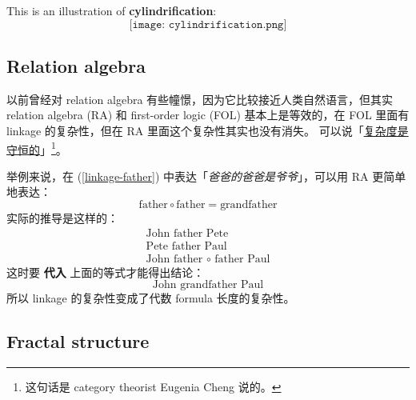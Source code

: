 \documentclass[orivec]{llncs}
\newcommand{\emp}[1]{\textbf{\textcolor{Cerulean}{#1}}}
\begin{document}
\begin{tcolorbox}
This is an illustration of \textbf{cylindrification}:
\begin{equation}
\texttt{[image: cylindrification.png]}
\end{equation}

\subsection{Relation algebra}


以前曾经对 relation algebra \cite{Schmidt2010} \cite{Maddux2006} 有些幢憬，因为它比较接近人类自然语言，但其实 relation algebra (RA) 和 first-order logic (FOL) 基本上是等效的，在 FOL 里面有 linkage 的复杂性，但在 RA 里面这个复杂性其实也没有消失。 可以说「\underline{复杂度是守恒的}」\footnote{这句话是 category theorist Eugenia Cheng 说的。}。

举例来说，在 (\ref{linkage-father}) 中表达「\textit{爸爸的爸爸是爷爷}」，可以用 RA 更简单地表达：
\begin{equation}
 \mbox{father} \circ \mbox{father} = \mbox{grandfather}
\end{equation}
实际的推导是这样的：
\begin{eqnarray}
\mbox{John father Pete} \nonumber \\
\mbox{Pete father Paul} \nonumber \\
\mbox{John father $\circ$ father Paul} 
\end{eqnarray}
这时要 \emp{代入} 上面的等式才能得出结论：
\begin{equation}
\mbox{John grandfather Paul}
\end{equation}
所以 linkage 的复杂性变成了代数 formula 长度的复杂性。 

\subsection{Fractal structure}


\end{tcolorbox}
\end{document}
